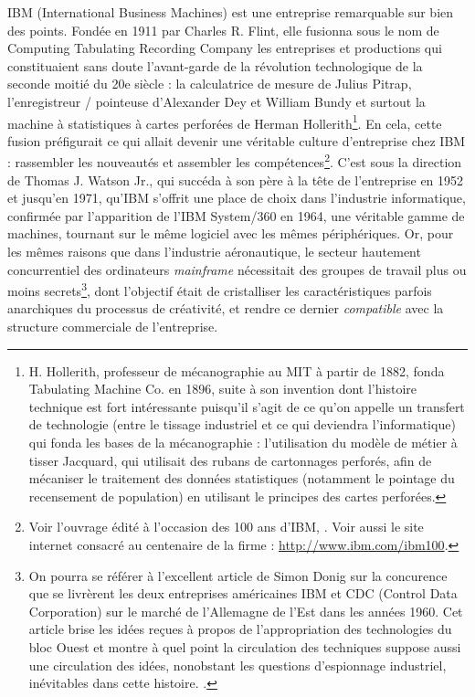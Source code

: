 \documentclass{FramateX}
\begin{document}
\begin{refsection}
IBM (International Business Machines) est une entreprise remarquable sur
bien des points. Fondée en 1911 par Charles R. Flint, elle fusionna
sous le nom de Computing Tabulating Recording Company les entreprises
et productions qui constituaient sans doute
l'avant-garde de la révolution technologique de la
seconde moitié du 20e siècle : la calculatrice de mesure de Julius
Pitrap, l'enregistreur / pointeuse
d'Alexander Dey et William Bundy et surtout la machine
à statistiques à cartes perforées de Herman Hollerith\footnote{H.
Hollerith, professeur de mécanographie au MIT à partir de 1882, fonda
Tabulating Machine Co. en 1896, suite à son invention dont
l'histoire technique est fort intéressante
puisqu'il s'agit de ce
qu'on appelle un transfert de technologie (entre le
tissage industriel et ce qui deviendra l'informatique)
qui fonda les bases de la mécanographie :
l'utilisation du modèle de métier à tisser Jacquard,
qui utilisait des rubans de cartonnages perforés, afin de mécaniser le
traitement des données statistiques (notamment le pointage du
recensement de population) en utilisant le principes des cartes
perforées.}. En cela, cette fusion préfigurait ce qui allait devenir
une véritable culture d'entreprise chez IBM :
rassembler les nouveautés et assembler les compétences\footnote{Voir
l'ouvrage édité à l'occasion des 100
ans d'IBM, \cite{maneymaking2011}. Voir
aussi le site internet consacré au centenaire de la firme :
\url{http://www.ibm.com/ibm100}.}. C'est sous la
direction de Thomas J. Watson Jr., qui succéda à son père à la tête de
l'entreprise en 1952 et jusqu'en
1971, qu'IBM s'offrit une place de
choix dans l'industrie informatique, confirmée par
l'apparition de l'IBM System/360 en
1964, une véritable gamme de machines, tournant sur le même logiciel
avec les mêmes périphériques. Or, pour les mêmes raisons que dans
l'industrie aéronautique, le secteur hautement
concurrentiel des ordinateurs \textit{mainframe} nécessitait des
groupes de travail plus ou moins secrets\footnote{On pourra se
référer à l'excellent article de Simon Donig sur la
concurence que se livrèrent les deux entreprises américaines IBM et
CDC (Control Data Corporation) sur le marché de
l'Allemagne de l'Est dans les années
1960. Cet article brise les idées reçues à propos de
l'appropriation des technologies du bloc Ouest et
montre à quel point la circulation des techniques suppose aussi une
circulation des idées, nonobstant les questions
d'espionnage industriel, inévitables dans cette
histoire. \cite{donigappropriating2010}.}, dont
l'objectif était de cristalliser les caractéristiques
parfois anarchiques du processus de créativité, et rendre ce dernier
\textit{compatible} avec la structure commerciale de
l'entreprise.


\end{refsection}
\end{document}
